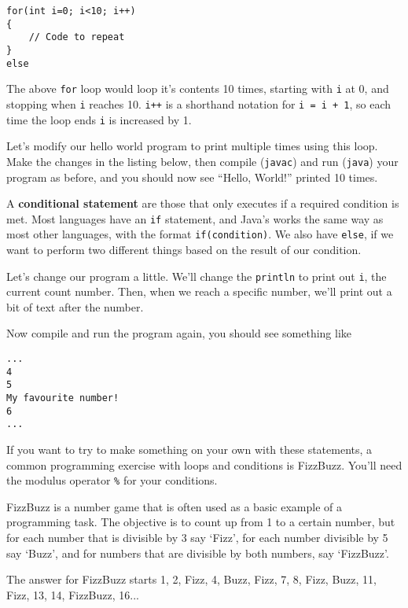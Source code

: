 		\begin{lstlisting}[style=Java, firstnumber=5]
for(int i=0; i<10; i++)
{
	// Code to repeat
}
else
		\end{lstlisting}
	
		The above \texttt{for} loop would loop it's contents 10 times, starting with \texttt{i} at 0, and stopping when \texttt{i} reaches 10. \texttt{i++} is a shorthand notation for \texttt{i = i + 1}, so each time the loop ends \texttt{i} is increased by 1.
		
		Let's modify our hello world program to print multiple times using this loop. Make the changes in the listing below, then compile (\texttt{javac}) and run (\texttt{java}) your program as before, and you should now see ``Hello, World!'' printed 10 times.
		
		
		
		A \textbf{conditional statement} are those that only executes if a required condition is met. Most languages have an \texttt{if} statement, and Java's works the same way as most other languages, with the format \texttt{if(condition)}. We also have \texttt{else}, if we want to perform two different things based on the result of our condition.
		
		Let's change our program a little. We'll change the \texttt{println} to print out \texttt{i}, the current count number. Then, when we reach a specific number, we'll print out a bit of text after the number.
		
		
		
		Now compile and run the program again, you should see something like
		
		\begin{lstlisting}[style=Terminal]
...
4
5
My favourite number!
6
...
		\end{lstlisting}
		
		If you want to try to make something on your own with these statements, a common programming exercise with loops and conditions is FizzBuzz. You'll need the modulus operator \texttt{\%} for your conditions.
		
		\begin{aside}[FizzBuzz]
			FizzBuzz is a number game that is often used as a basic example of a programming task. The objective is to count up from 1 to a certain number, but for each number that is divisible by 3 say `Fizz', for each number divisible by 5 say `Buzz', and for numbers that are divisible by both numbers, say `FizzBuzz'.
			
			The answer for FizzBuzz starts 1, 2, Fizz, 4, Buzz, Fizz, 7, 8, Fizz, Buzz, 11, Fizz, 13, 14, FizzBuzz, 16...
		\end{aside}
	
